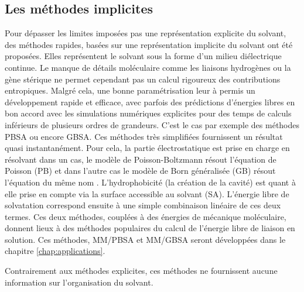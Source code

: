 \subsection{Les méthodes implicites}
Pour dépasser les limites imposées pas une représentation explicite du solvant, des méthodes rapides, basées sur une représentation implicite du solvant ont été proposées\cite{Skyner_review_2015}. Elles représentent le solvant sous la forme d'un milieu diélectrique continue. Le manque de détails moléculaire comme les liaisons hydrogènes ou la gène stérique ne permet cependant pas un calcul rigoureux des contributions entropiques. Malgré cela, une bonne paramétrisation leur à permis un développement rapide et efficace, avec parfois des prédictions d'énergies libres en bon accord avec les simulations numériques explicites pour des temps de calculs inférieurs de plusieurs ordres de grandeurs. C'est le cas par exemple des méthodes PBSA ou encore GBSA. Ces méthodes très simplifiées fournissent un résultat quasi instantanément. Pour cela, la partie électrostatique est prise en charge en résolvant dans un cas, le modèle de Poisson-Boltzmann résout l'équation de Poisson (PB) et dans l'autre cas le modèle de Born généralisée (GB) résout l'équation du même nom  \cite{Skyner_review_2015}. L'hydrophobicité (la création de la cavité) est quant à elle prise en compte via la surface accessible au solvant (SA). L'énergie libre de solvatation correspond ensuite à une simple combinaison linéaire de ces deux termes.  Ces deux méthodes, couplées à des énergies de mécanique moléculaire, donnent lieux à des méthodes populaires du calcul de l'énergie libre de liaison en solution. Ces méthodes, MM/PBSA et MM/GBSA\cite{kollman_calculating_2000,srinivasan_continuum_1998,genheden_mm/pbsa_2015} seront développées dans le chapitre \ref{chap:applications}.

Contrairement aux méthodes explicites, ces méthodes ne fournissent aucune information sur l'organisation du solvant.


